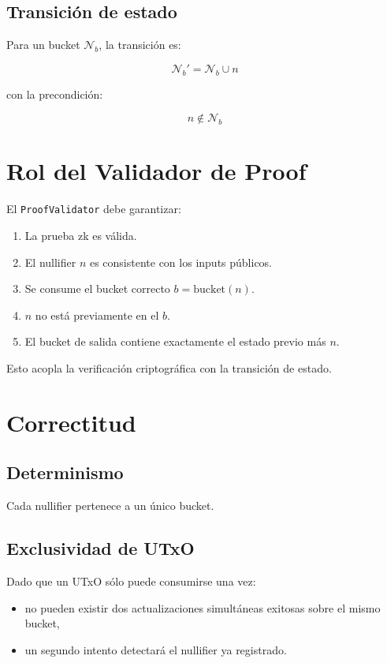 \documentclass[11pt]{article}
\begin{document}
	\subsection{Transición de estado}
	
	Para un bucket $\mathcal{N}_b$, la transición es:
	
	$$\mathcal{N}_b' = \mathcal{N}_b \cup {n}$$
		
	con la precondición:
	
	$$n \notin \mathcal{N}_b$$
	
	\section{Rol del Validador de Proof}
	
	El \texttt{ProofValidator} debe garantizar:
	
	\begin{enumerate}
		\item La prueba zk es válida.
		\item El nullifier $n$ es consistente con los inputs públicos.
		\item Se consume el bucket correcto $b = \text{bucket}(n)$.
		\item $n$ no está previamente en el $b$.
		\item El bucket de salida contiene exactamente el estado previo más $n$.
	\end{enumerate}
	
	Esto acopla la verificación criptográfica con la transición de estado.
	
	\section{Correctitud}
	
	\subsection{Determinismo}
	
	Cada nullifier pertenece a un único bucket.
	
	\subsection{Exclusividad de UTxO}
	
	Dado que un UTxO sólo puede consumirse una vez:
	
	\begin{itemize}
		\item no pueden existir dos actualizaciones simultáneas exitosas sobre el mismo bucket,
		\item un segundo intento detectará el nullifier ya registrado.
	\end{itemize}
	
\end{document}

